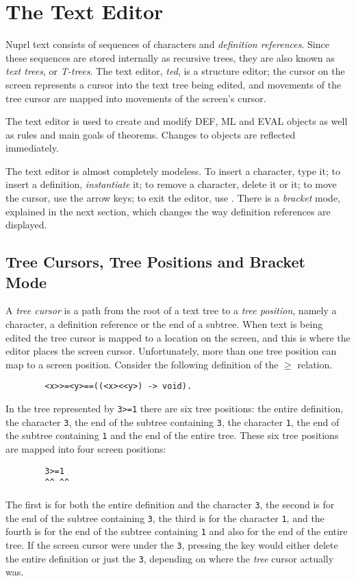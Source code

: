 \chapter{The Text Editor}

Nuprl text consists of sequences of characters and {\em definition
references}.  Since these sequences are stored internally as recursive
trees, they are also known as {\em text{} trees}, or {\em T-trees}{}.
The text{} editor, {\em ted}, is a structure{} editor; the cursor on
the screen represents a cursor into the text tree being edited, and
movements of the tree cursor are mapped into movements of the screen's
cursor.

The text editor is used to create and modify DEF, ML and EVAL objects
as well as rules and main goals of theorems.
Changes to objects are reflected immediately.

The text editor is almost completely modeless.
To insert a character, type it;
to insert a definition, {\em instantiate} it;
to remove a character, delete it or \KILL{} it;
to move the cursor, use the arrow keys;
to exit the editor, use \EXIT.
There is a {\em bracket} mode, explained in the next section,
which changes the way definition references are displayed.

\section{Tree Cursors, Tree Positions and Bracket Mode}

A {\em tree{} cursor}{}
is a path from the root of a text tree to a
{\em tree{} position}, namely
a character, a definition reference or the end of a subtree.
When text is being edited the tree cursor is mapped to a location on the
screen,
and this is where the editor places the screen cursor.
Unfortunately, more than one tree position can map to a screen
position.
Consider the following definition of the $\geq$ relation.
\begin{verbatim}
        <x>>=<y>==((<x><<y>) -> void).
\end{verbatim}
In the tree represented by {\tt 3>=1} there are six tree positions:
the entire definition,
the character {\tt 3},
the end of the subtree containing {\tt 3},
the character {\tt 1},
the end of the subtree containing {\tt 1} and
the end of the entire tree.
These six tree positions are mapped into four screen positions:
\begin{verbatim}
        3>=1
        ^^ ^^
\end{verbatim}
The first is for both the entire definition and the character {\tt 3},
the second is for the end of the subtree containing {\tt 3},
the third is for the character {\tt 1},
and the fourth is for the end of the subtree containing {\tt 1} and also for
the end of the entire tree.
If the screen cursor were under the {\tt 3}, pressing the \KILL{} key would
either delete the entire definition or just the {\tt 3}, depending on where the
{\em tree} cursor actually was.

